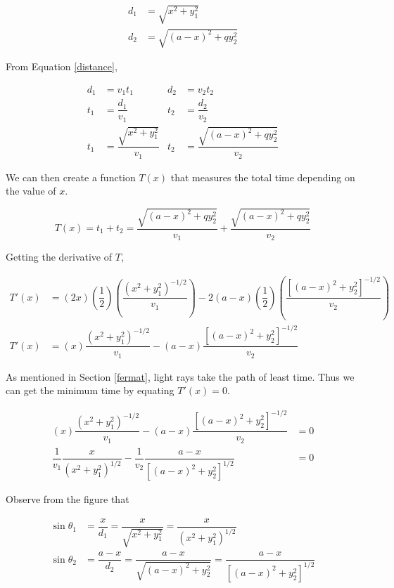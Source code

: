\documentclass[a4paper,12pt]{article}
\begin{document}
\begin{align}
d_1 &= \sqrt{x^2 + y_1^2} \nonumber\\
d_2 &= \sqrt{(a-x)^2 +  qy_2^2} \nonumber
\end{align}

From Equation \eqref{distance},

\begin{align}
d_1 &= v_1 t_1 & d_2 &= v_2 t_2 \nonumber\\
t_1 &= \dfrac{d_1}{v_1} & t_2 &= \dfrac{d_2}{v_2}\nonumber\\
t_1 &= \dfrac{\sqrt{x^2 + y_1^2}}{v_1} & t_2 &= \dfrac{\sqrt{(a-x)^2 + qy_2^2}}{v_2}
\end{align}

We can then create a function $T(x)$ that measures the total time depending on the value of $x$.

\begin{equation}
T(x) = t_1 + t_2 =\dfrac{\sqrt{(a-x)^2 + qy_2^2}}{v_1} + \dfrac{\sqrt{(a-x)^2 + qy_2^2}}{v_2} 
\end{equation}

Getting the derivative of $T$,

\begin{align}
T'(x) &= (2x) \left( \dfrac{1}{2} \right) \left(\dfrac{(x^2 + y_1^2)^{-1/2}}{v_1} \right) - 2(a-x)\left( \dfrac{1}{2} \right) \left( \dfrac{[(a-x)^2+y_2^2]^{-1/2}}{v_2} \right) \nonumber\\
T'(x) &= (x) \dfrac{(x^2 + y_1^2)^{-1/2}}{v_1} - (a-x)\dfrac{[(a-x)^2+y_2^2]^{-1/2}}{v_2}
\end{align}

As mentioned in Section \ref{fermat}, light rays take the path of least time. Thus we can get the minimum time by equating $T'(x) = 0$.

\begin{align}
(x) \dfrac{(x^2 + y_1^2)^{-1/2}}{v_1} - (a-x)\dfrac{[(a-x)^2+y_2^2]^{-1/2}}{v_2} &= 0  \nonumber \\
\dfrac{1}{v_1} \dfrac{x}{(x^2 + y_1^2)^{1/2}}  -  \dfrac{1}{v_2} \dfrac{a-x}{[(a-x)^2 + y_2^2]^{1/2}}  &= 0 \label{badsnell}
\end{align}

Observe from the figure that

\begin{align}
\sin \theta_1 &= \dfrac{x}{d_1} = \dfrac{x}{\sqrt{x^2 + y_1^2}} =\dfrac{x}{(x^2 +y_1^2)^{1/2}} \\
\sin \theta_2 &= \dfrac{a-x}{d_2} = \dfrac{a-x}{\sqrt{(a-x)^2 + y_2^2}} = \dfrac{a-x}{[(a-x)^2 + y_2^2]^{1/2}} 
\end{align}
\end{document}
